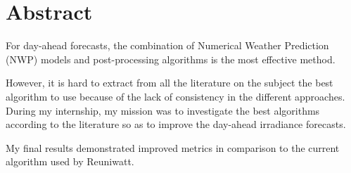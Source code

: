 \section*{Abstract}

For day-ahead forecasts, the combination of Numerical Weather Prediction (NWP) models and post-processing algorithms is the most effective method.

However, it is hard to extract from all the literature on the subject the best algorithm to use because of the lack of consistency in the different approaches.\\ 

During my internship, my mission was to investigate the best algorithms according to the literature so as to improve the day-ahead irradiance forecasts. 

My final results demonstrated improved metrics in comparison to the current algorithm used by Reuniwatt.